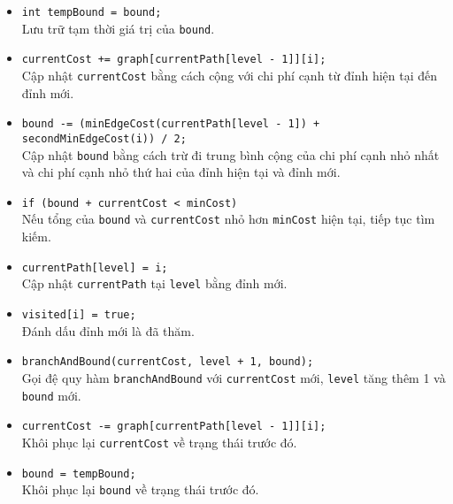 \documentclass[a4paper]{article}
\begin{document}
\begin{itemize}
\begin{itemize}
\begin{itemize}
        \item \texttt{int tempBound = bound;} \\ 
        Lưu trữ tạm thời giá trị của \texttt{bound}.

        \item \texttt{currentCost += graph[currentPath[level - 1]][i];} \\ 
        Cập nhật \texttt{currentCost} bằng cách cộng với chi phí cạnh từ đỉnh hiện tại đến đỉnh mới.

        \item \texttt{bound -= (minEdgeCost(currentPath[level - 1]) + secondMinEdgeCost(i)) / 2;} \\ 
        Cập nhật \texttt{bound} bằng cách trừ đi trung bình cộng của chi phí cạnh nhỏ nhất và chi phí cạnh nhỏ thứ hai của đỉnh hiện tại và đỉnh mới.

        \item \texttt{if (bound + currentCost < minCost)} \\ 
        Nếu tổng của \texttt{bound} và \texttt{currentCost} nhỏ hơn \texttt{minCost} hiện tại, tiếp tục tìm kiếm.

        \item \texttt{currentPath[level] = i;} \\ 
        Cập nhật \texttt{currentPath} tại \texttt{level} bằng đỉnh mới.

        \item \texttt{visited[i] = true;} \\ 
        Đánh dấu đỉnh mới là đã thăm.

        \item \texttt{branchAndBound(currentCost, level + 1, bound);} \\ 
        Gọi đệ quy hàm \texttt{branchAndBound} với \texttt{currentCost} mới, \texttt{level} tăng thêm 1 và \texttt{bound} mới.

        \item \texttt{currentCost -= graph[currentPath[level - 1]][i];} \\ 
        Khôi phục lại \texttt{currentCost} về trạng thái trước đó.

        \item \texttt{bound = tempBound;} \\ 
        Khôi phục lại \texttt{bound} về trạng thái trước đó.


\end{itemize}
\end{itemize}
\end{itemize}
\end{document}
